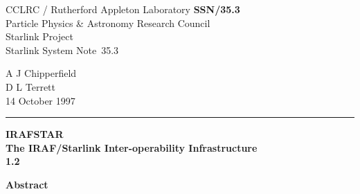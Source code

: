 \documentclass[twoside,11pt]{article}
\newcommand{\stardoccategory}  {Starlink System Note}
\newcommand{\stardocinitials}  {SSN}
\newcommand{\stardocnumber}    {35.3}
\newcommand{\stardocauthors}   {A J Chipperfield\\D L Terrett}
\newcommand{\stardocdate}      {14 October 1997}
\newcommand{\stardoctitle}     {IRAFSTAR\\[1ex]
                             The IRAF/Starlink Inter-operability Infrastructure}
\newcommand{\stardocversion}   {1.2}
\newcommand{\stardocmanual}    {}
\newcommand{\stardocname}{\stardocinitials /\stardocnumber}
\newenvironment{latexonly}{}{}
\begin{document}
\thispagestyle{empty}

\begin{latexonly}
   CCLRC / {\sc Rutherford Appleton Laboratory} \hfill {\bfseries \stardocname}\\
   {\large Particle Physics \& Astronomy Research Council}\\
   {\large Starlink Project\\}
   {\large \stardoccategory\ \stardocnumber}
   \begin{flushright}
   \stardocauthors\\
   \stardocdate
   \end{flushright}
   \vspace{-4mm}
   \rule{\textwidth}{0.5mm}
   \vspace{5mm}
   \begin{center}
   {\Huge\bfseries  \stardoctitle \\ [2.5ex]}
   {\LARGE\bfseries \stardocversion \\ [4ex]}
   {\Huge\bfseries  \stardocmanual}
   \end{center}
   \vspace{5mm}

   \vspace{10mm}
   \begin{center}
      {\Large\bfseries Abstract}
   \end{center}
\end{latexonly}
\end{document}

